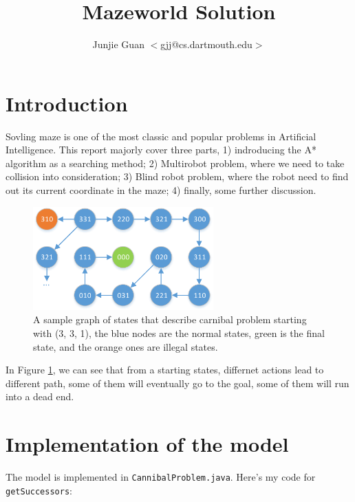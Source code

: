 \documentclass{article}
\title{Mazeworld Solution}
\author{Junjie Guan $<$gjj@cs.dartmouth.edu$>$}
\begin{document}
\maketitle

\section{Introduction}

Sovling maze is one of the most classic and popular problems in Artificial Intelligence. This report majorly cover three parts, 1) indroducing the A* algorithm as a searching method; 2) Multirobot problem, where we need to take collision into consideration; 3) Blind robot problem, where the robot need to find out its current coordinate in the maze; 4) finally, some further discussion.

\begin{figure}[!h]
\centering
\includegraphics[width=0.618\textwidth]{hw1.pdf}
\caption{A sample graph of states that describe carnibal problem starting with (3, 3, 1), the blue nodes are the normal states, green is the final state, and the orange ones are illegal states.}
\label{states}
\end{figure}

In Figure \ref{states}, we can see that from a starting states, differnet actions lead to different path, some of them will eventually go to the goal, some of them will run into a dead end.

\section{Implementation of the model}

The model is implemented in 
\verb`CannibalProblem.java`.  Here's my code for \verb`getSuccessors`:
\end{document}
